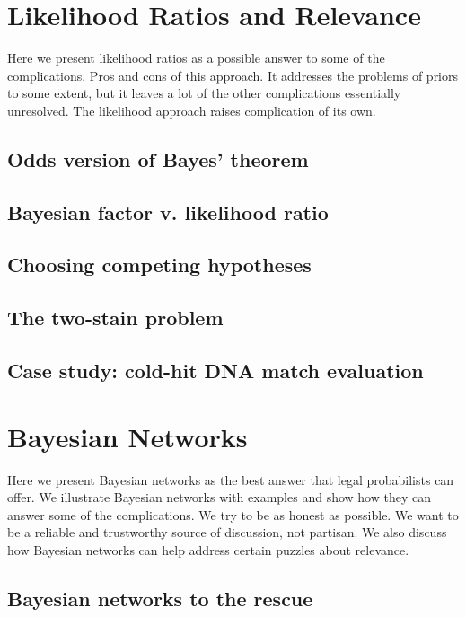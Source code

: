 \documentclass[]{book}
\begin{document}
\chapter{Likelihood Ratios and Relevance}

Here we present likelihood ratios as a possible
answer to some of the complications. Pros and cons
of this approach. It addresses
the problems of priors to some extent,
but it leaves a lot of the other complications essentially unresolved.
The likelihood approach raises
complication of its own.

\section{Odds version of Bayes' theorem}

\section{Bayesian factor v. likelihood ratio}

\section{Choosing competing hypotheses}

\section{The two-stain problem}

\section{Case study: cold-hit DNA match evaluation}

\chapter{Bayesian Networks}

Here we present Bayesian networks
as the best answer that legal probabilists
can offer. We illustrate Bayesian networks
with examples and show how they can answer
some of the complications. We try to be
as honest as possible. We want to be a reliable and trustworthy
source of discussion, not partisan. We also discuss
how Bayesian networks can help address certain
puzzles about relevance.

\section{Bayesian networks to the rescue}
\end{document}
